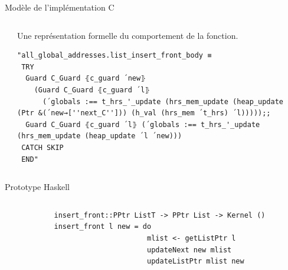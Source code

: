 \documentclass[hyperref={pdfpagelabels=false}]{beamer}
\begin{document}
\begin{frame}[fragile]{Modèle de l'implémentation C}
  \begin{columns}[T] %
    \begin{column}{.15\textwidth}
    \end{column}%
    \hfill%
    \begin{column}{.83\textwidth}
      Une représentation formelle du comportement de la fonction.
      \begin{tcolorbox}[title=Exemple]
        \begin{lstlisting}[basicstyle=\tiny]
"all_global_addresses.list_insert_front_body ≡
 TRY
  Guard C_Guard ⦃c_guard ´new⦄
    (Guard C_Guard ⦃c_guard ´l⦄
      (´globals :== t_hrs_'_update (hrs_mem_update (heap_update (Ptr &(´new→[''next_C''])) (h_val (hrs_mem ´t_hrs) ´l)))));;
  Guard C_Guard ⦃c_guard ´l⦄ (´globals :== t_hrs_'_update (hrs_mem_update (heap_update ´l ´new)))
 CATCH SKIP
 END"
        \end{lstlisting}
      \end{tcolorbox}
    \end{column}%
  \end{columns}
\end{frame}


\begin{frame}[fragile]{Prototype Haskell}
  \begin{columns}[T] %
    \begin{column}{.15\textwidth}
    \end{column}%
    \hfill%
    \begin{column}{.83\textwidth}
      \begin{tcolorbox}[title=Exemple]
        \begin{verbatim}
insert_front::PPtr ListT -> PPtr List -> Kernel ()
insert_front l new = do
                      mlist <- getListPtr l
                      updateNext new mlist
                      updateListPtr mlist new
        \end{verbatim}
      \end{tcolorbox}
    \end{column}%
  \end{columns}
\end{frame}
\end{document}
